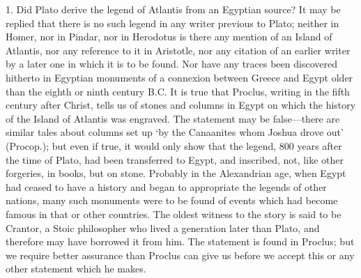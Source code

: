 1. Did Plato derive the legend of Atlantis from an Egyptian source? It may
be replied that there is no such legend in any writer previous to Plato;
neither in Homer, nor in Pindar, nor in Herodotus is there any mention of
an Island of Atlantis, nor any reference to it in Aristotle, nor any
citation of an earlier writer by a later one in which it is to be found.
Nor have any traces been discovered hitherto in Egyptian monuments of a
connexion between Greece and Egypt older than the eighth or ninth century
B.C. It is true that Proclus, writing in the fifth century after Christ,
tells us of stones and columns in Egypt on which the history of the Island
of Atlantis was engraved. The statement may be false—there are
similar tales about columns set up ‘by the Canaanites whom Joshua drove
out’ (Procop.); but even if true, it would only show that the legend, 800
years after the time of Plato, had been transferred to Egypt, and
inscribed, not, like other forgeries, in books, but on stone. Probably in
the Alexandrian age, when Egypt had ceased to have a history and began to
appropriate the legends of other nations, many such monuments were to be
found of events which had become famous in that or other countries. The
oldest witness to the story is said to be Crantor, a Stoic philosopher who
lived a generation later than Plato, and therefore may have borrowed it
from him. The statement is found in Proclus; but we require better
assurance than Proclus can give us before we accept this or any other
statement which he makes.

